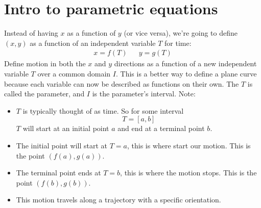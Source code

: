 \documentclass{report}
\begin{document}
\section{Intro to parametric equations}
    Instead of having \(x\) as a function of \(y\) (or vice versa), we're going to define \((x, y)\) as a function of an independent variable \(T\) for time:
    \begin{align*}
        x = f(T) &&
        y = g(T)
    \end{align*}
    Define motion in both the \(x\) and \(y\) directions as a function of a new independent variable \(T\) over a common domain \(I\).
    This is a better way to define a plane curve because each variable can now be described as functions on their own.
    The \(T\) is called the parameter, and \(I\) is the parameter's interval. 
    Note:
    \begin{itemize}
        \item \(T\) is typically thought of as time.
        So for some interval \[T = [a, b]\] \(T\) will start at an initial point \(a\) and end at a terminal point \(b\).
        \item The initial point will start at \(T = a\), this is where start our motion.
        This is the point \((f(a), g(a))\).
        \item The terminal point ends at \(T = b\), this is where the motion stops.
        This is the point \((f(b), g(b))\).
        \item This motion travels along a trajectory with a specific orientation.
    \end{itemize}
\end{document}

